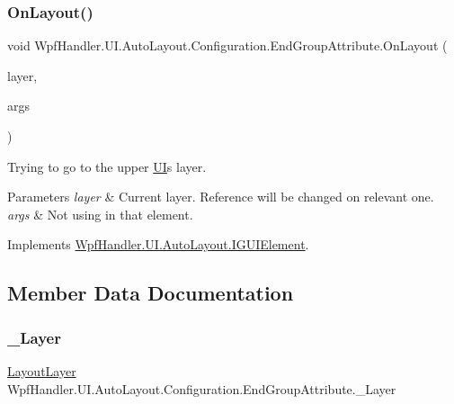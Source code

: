 \subsubsection{\texorpdfstring{On\+Layout()}{OnLayout()}}
{\footnotesize\ttfamily void Wpf\+Handler.\+U\+I.\+Auto\+Layout.\+Configuration.\+End\+Group\+Attribute.\+On\+Layout (\begin{DoxyParamCaption}\item[{ref \mbox{\hyperlink{class_wpf_handler_1_1_u_i_1_1_auto_layout_1_1_layout_layer}{Layout\+Layer}}}]{layer,  }\item[{params object \mbox{[}$\,$\mbox{]}}]{args }\end{DoxyParamCaption})}



Trying to go to the upper \mbox{\hyperlink{namespace_wpf_handler_1_1_u_i}{UI}}\textquotesingle{}s layer. 


\begin{DoxyParams}{Parameters}
{\em layer} & Current layer. Reference will be changed on relevant one.\\
\hline
{\em args} & Not using in that element.\\
\hline
\end{DoxyParams}


Implements \mbox{\hyperlink{interface_wpf_handler_1_1_u_i_1_1_auto_layout_1_1_i_g_u_i_element_a0ff16956f8e8187d51e1b36b6b9f894e}{Wpf\+Handler.\+U\+I.\+Auto\+Layout.\+I\+G\+U\+I\+Element}}.



\subsection{Member Data Documentation}
\mbox{\label{class_wpf_handler_1_1_u_i_1_1_auto_layout_1_1_configuration_1_1_end_group_attribute_a8f6eb211c88e7d5ade018a8f79d34a17}} 
\subsubsection{\texorpdfstring{\+\_\+\+Layer}{\_Layer}}
{\footnotesize\ttfamily \mbox{\hyperlink{class_wpf_handler_1_1_u_i_1_1_auto_layout_1_1_layout_layer}{Layout\+Layer}} Wpf\+Handler.\+U\+I.\+Auto\+Layout.\+Configuration.\+End\+Group\+Attribute.\+\_\+\+Layer\hspace{0.3cm}{\ttfamily [private]}}



